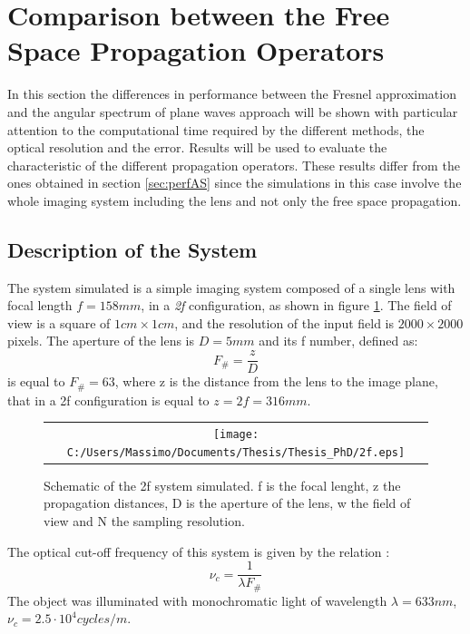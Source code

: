  \section{Comparison between the Free Space Propagation Operators}
 \label{sec:comp}
	 In this section the differences in performance between the Fresnel approximation and the angular spectrum of plane waves approach will be shown with particular attention to the computational time required by the different methods, the optical resolution and the error. Results will be used to evaluate the characteristic of the different propagation operators. These results differ from the ones obtained in section \ref{sec:perfAS} since the simulations in this case involve the whole imaging system including the lens and not only the free space propagation.
	 \subsection{Description of the System}
	 \label{sec:system}
	 The system simulated is a simple imaging system composed of a single lens with focal length $f=158mm$, in a \textit{2f} configuration, as shown in figure \ref{fig:2f}. The field of view is a square of $1cm \times 1cm$, and the resolution of the input field is $2000 \times 2000$ pixels. The aperture of the lens is $D=5mm$ and its f number, defined as:
	 \begin{equation}
	 \label{eq:fnum}
		F_{\#}=\dfrac{z}{D}
	 \end{equation}
	 is equal to $F_{\#}=63$, where z is the distance from the lens to the image plane, that in a 2f configuration is equal to $z=2f=316mm$.
	 \begin{figure}[h]
	 	\begin{center}
	 		\begin{tabular}{c}
	 			\texttt{[image: C:/Users/Massimo/Documents/Thesis/Thesis\_PhD/2f.eps]}
	 		\end{tabular}
	 	\end{center}
	 	\caption{ \label{fig:2f} 
	 		Schematic of the 2f system simulated. f is the focal lenght, z the propagation distances, D is the aperture of the lens, w the field of view and N the sampling resolution. }
	 \end{figure} 
	 The optical cut-off frequency of this system is given by the relation \cite{goodman2005introduction}:
	 \begin{equation}
	 \label{eq:cutoff}
	 \nu_c=\dfrac{1}{\lambda F_{\#}}
	 \end{equation} 
	 The object was illuminated with monochromatic light of wavelength $\lambda=633nm$, $\nu_c=2.5\cdot10^4 cycles/m$.
